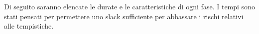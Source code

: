 Di seguito saranno elencate le durate e le caratteristiche di ogni fase. I tempi sono stati pensati per permettere uno slack sufficiente per abbassare i rischi relativi alle tempistiche.
	
	
	
	
	
	
	
	
